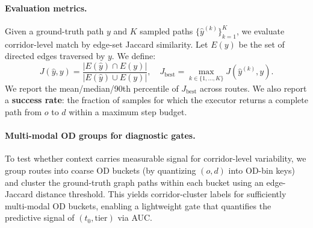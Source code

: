 \paragraph{Evaluation metrics.}
Given a ground-truth path $y$ and $K$ sampled paths $\{\hat{y}^{(k)}\}_{k=1}^K$, we evaluate corridor-level match by edge-set Jaccard similarity.
Let $E(y)$ be the set of directed edges traversed by $y$.
We define:
\begin{equation}
  J(\hat{y},y)=\frac{|E(\hat{y})\cap E(y)|}{|E(\hat{y})\cup E(y)|},
  \quad
  J_{\mathrm{best}}=\max_{k\in\{1,\dots,K\}} J(\hat{y}^{(k)},y).
\end{equation}
We report the mean/median/90th percentile of $J_{\mathrm{best}}$ across routes.
We also report a \textbf{success rate}: the fraction of samples for which the executor returns a complete path from $o$ to $d$ within a maximum step budget.

\paragraph{Multi-modal OD groups for diagnostic gates.}
To test whether context carries measurable signal for corridor-level variability, we group routes into coarse OD buckets (by quantizing $(o,d)$ into OD-bin keys) and cluster the ground-truth graph paths within each bucket using an edge-Jaccard distance threshold.
This yields corridor-cluster labels for sufficiently multi-modal OD buckets, enabling a lightweight gate that quantifies the predictive signal of $(t_0,\text{tier})$ via AUC.
